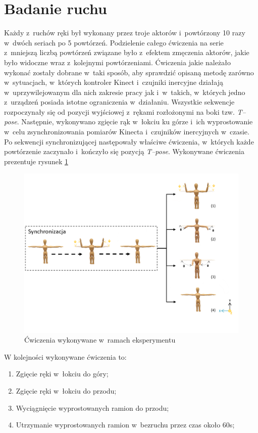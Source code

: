 \section{Badanie ruchu}

Każdy z~ruchów ręki był wykonany przez troje aktorów i~powtórzony 10 razy w~dwóch seriach po 5 powtórzeń. Podzielenie całego ćwiczenia na serie z~mniejszą liczbą powtórzeń związane było z~efektem zmęczenia aktorów, jakie było widoczne wraz z~kolejnymi powtórzeniami. Ćwiczenia jakie należało wykonać zostały dobrane w~taki sposób, aby sprawdzić opisaną metodę zarówno w~sytuacjach, w~których kontroler Kinect i~czujniki inercyjne działają w~uprzywilejowanym dla nich zakresie pracy jak i~w~takich, w~których jedno z~urządzeń posiada istotne ograniczenia w~działaniu. Wszystkie sekwencje rozpoczynały się od pozycji wyjściowej z~rękami rozłożonymi na boki tzw. \emph{T--pose}. Następnie, wykonywano zgięcie rąk w~łokciu ku górze i~ich wyprostowanie w~celu zsynchronizowania pomiarów Kinecta i~czujników inercyjnych w~czasie. Po sekwencji synchronizującej następowały właściwe ćwiczenia, w~których każde powtórzenie zaczynało i~kończyło się pozycją \emph{T--pose}. Wykonywane ćwiczenia prezentuje rysunek \ref{fig:experiments:poses}

\begin{figure}[!htp]
	\centering
	\includegraphics[width=\textwidth]{images/poses.png}
	\caption{Ćwiczenia wykonywane w~ramach eksperymentu}
	\label{fig:experiments:poses}
\end{figure}

W kolejności wykonywane ćwiczenia to:
\begin{enumerate}
	\item Zgięcie ręki w~łokciu do góry; \\
	\item Zgięcie ręki w~łokciu do przodu; \\
	\item Wyciągnięcie wyprostowanych ramion do przodu; \\
	\item Utrzymanie wyprostowanych ramion w~bezruchu przez czas około 60s; \\
\end{enumerate}

